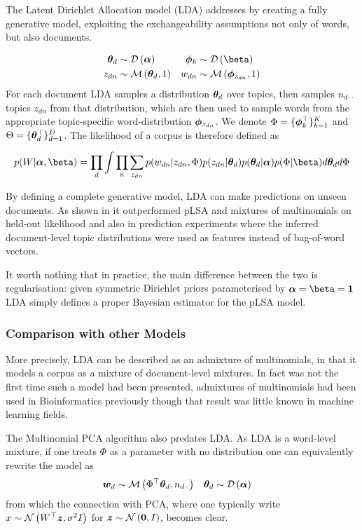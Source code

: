 The Latent Dirichlet Allocation model\cite{BleiNgJordan2003} (LDA) addresses by creating a fully generative model, exploiting the exchangeability assumptions not only of words, but also documents.

\begin{align}
\thd & \sim \dir{\vv{\alpha}} & \pk & \sim \dir{\vv{\beta}} \\
z_{dn} & \sim \muln{\thd}{1} & w_{dn} & \sim \muln{\vv{\phi}_{z_{dn}}}{1}
\end{align}
For each document LDA samples a distribution ${ \bm \theta_d }$ over topics, then samples $n_{d\cdot\cdot}$ topics $z_{dn}$ from that distribution, which are then used to sample words from the appropriate topic-specific word-distribution $\bm \phi_{z_{dn}}$. We denote $\Phi = \{ \bm \phi_k^\top \}_{k=1}^K$ and $\Theta = \{ \bm \theta_d^\top \}_{d=1}^D$. The likelihood of a corpus is therefore defined as

\begin{align}
p(W | \vv{\alpha}, \vv{\beta}) = \prod_d \int \prod_n \sum_{z_{dn}} p(w_{dn}|z_{dn}, \Phi)p(z_{dn}|\thd)p(\thd|\vv{\alpha})p(\Phi|\vv{\beta}) d\thd d\Phi
\end{align}

By defining a complete generative model, LDA can make predictions on unseen documents. As shown in \cite{BleiNgJordan2003} it outperformed pLSA and mixtures of multinomials on held-out likelihood and also in prediction experiments where the inferred document-level topic distributions were used as features instead of bag-of-word vectors.

It worth nothing that in practice, the main difference between the two is regularisation: given symmetric Dirichlet priors parameterised by $\vv{\alpha} = \vv{\beta} = \vv{1}$ LDA simply defines a proper Bayesian estimator for the pLSA model\cite{GiKa2003}.

\subsubsection{Comparison with other Models}
More precisely, LDA can be described as an admixture of multinomials, in that it models a corpus as a mixture of document-level mixtures. In fact \cite{BleiNgJordan2003} was not the first time such a model had been presented,  admixtures of multinomials had been used in Bioinformatics previously\cite{Pritchard2000} though that result was little known in machine learning fields. 

The Multinomial PCA algorithm\cite{Buntine2002} also predates LDA. As LDA is a word-level mixture, if one treats $\Phi$ as a parameter with no distribution one can equivalently rewrite the model as
\begin{align}
{  \bm w _d } & \sim \mathcal{M} \left( {\Phi^\top{  \bm \theta _d }},{n_{d\cdot\cdot}} \right) & { \bm \theta_d } & \sim \mathcal{D} \left( {\bm \alpha} \right)
\end{align}
from which the connection with PCA, where one typically write $x \sim \mathcal{N} \left( {W^\top\bm z}, {\sigma^2 I} \right)$ for $\bm z \sim \mathcal{N} \left( {\bm 0}, {I} \right)$, becomes clear.

